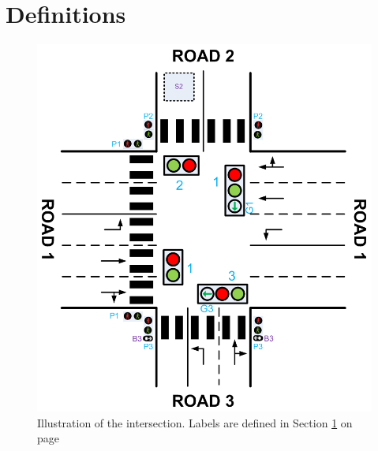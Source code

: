 \documentclass[letterpaper]{article}
\begin{document}
\section{Definitions}
\label{Definitions}
\begin{figure}[h]
 \centering
 \includegraphics[width=\textwidth]{intersection.png}
 \caption{Illustration of the intersection. Labels are defined in Section \ref{Definitions} on page \pageref{Definitions}}
 \label{intersection}
\end{figure}
\end{document}
